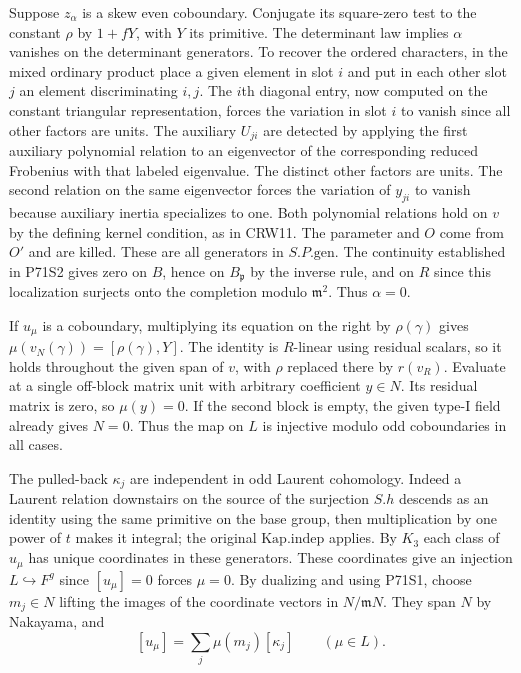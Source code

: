 Suppose $z_\alpha$ is a skew even coboundary. Conjugate its
square-zero test to the constant $\rho$ by $1+fY$, with $Y$
its primitive. The determinant law implies $\alpha$ vanishes
on the determinant generators. To recover the ordered characters,
in the mixed ordinary product place a given element in slot $i$
and put in each other slot $j$ an element discriminating $i,j$.
The $i$th diagonal entry, now computed on the constant triangular
representation, forces the variation in slot $i$ to vanish since
all other factors are units. The auxiliary $U_{ji}$ are detected
by applying the first auxiliary polynomial relation to an eigenvector
of the corresponding reduced Frobenius with that labeled eigenvalue.
The distinct other factors are units. The second relation on the
same eigenvector forces the variation of $y_{ji}$ to vanish because
auxiliary inertia specializes to one. Both polynomial relations
hold on $v$ by the defining kernel condition, as in CRW11.
The parameter and $O$ come from $O'$ and are killed. These are
all generators in $S.P.\mathrm{gen}$. The continuity established in
P71S2 gives zero on $B$, hence on $B_{\mathfrak p}$ by the
inverse rule, and on $R$ since this localization surjects onto
the completion modulo $\mathfrak m^2$. Thus $\alpha=0$.

If $u_\mu$ is a coboundary, multiplying its equation on the
right by $\rho(\gamma)$ gives
$\mu(v_N(\gamma))=[\rho(\gamma),Y]$. The identity is
$R$-linear using residual scalars, so it holds throughout the
given span of $v$, with $\rho$ replaced there by $r(v_R)$.
Evaluate at a single off-block matrix unit with arbitrary
coefficient $y\in N$. Its residual matrix is zero, so
$\mu(y)=0$. If the second block is empty, the given type-I
field already gives $N=0$. Thus the map on $L$ is injective
modulo odd coboundaries in all cases.

The pulled-back $\kappa_j$ are independent in odd Laurent cohomology.
Indeed a Laurent relation downstairs on the source of the surjection
$S.h$ descends as an identity using the same primitive on the base
group, then multiplication by one power of $t$ makes it integral;
the original $\mathrm{Kap.indep}$ applies. By $K_3$ each class of
$u_\mu$ has unique coordinates in these generators. These
coordinates give an injection $L\hookrightarrow F^g$ since
$[u_\mu]=0$ forces $\mu=0$. By dualizing and using P71S1,
choose $m_j\in N$ lifting the images of the coordinate vectors
in $N/\mathfrak mN$. They span $N$ by Nakayama, and
\[
       [u_\mu]=\sum_j\mu(m_j)[\kappa_j]
                  \qquad(\mu\in L).
\]

